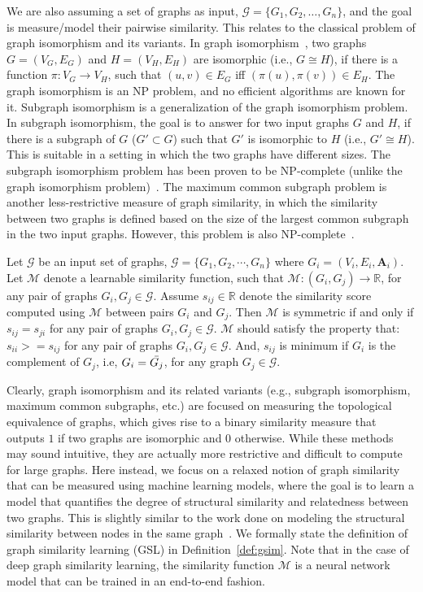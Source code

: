 We are also assuming a set of graphs as input, $\mathcal{G} = \{G_1, G_2, \dots, G_n\}$, and the goal is measure/model their pairwise similarity. This relates to the classical problem of graph isomorphism and its variants. In graph isomorphism~, two graphs $G = (V_G,E_G)$ and $H = (V_H,E_H)$ are isomorphic (i.e., $G \cong H$), if there is a  function $\pi: V_G \rightarrow V_H$, such that $(u,v) \in E_G$ iff $(\pi(u),\pi(v)) \in E_H$. The graph isomorphism is an NP problem, and no efficient algorithms are known for it. Subgraph isomorphism is a generalization of the graph isomorphism problem. In subgraph isomorphism, the goal is to answer for two input graphs $G$ and $H$, if there is a subgraph of $G$ ($G' \subset G$) such that $G'$ is isomorphic to $H$ (i.e., $G' \cong H$). This is suitable in a setting in which the two graphs have different sizes. The subgraph isomorphism problem has been proven to be NP-complete (unlike the graph isomorphism problem)~. The maximum common subgraph problem is another less-restrictive measure of graph similarity, in which the similarity between two graphs is defined based on the size of the largest common subgraph in the two input graphs. However, this problem is also NP-complete~.
\begin{mydef}\label{def:gsim}
Let $\mathcal{G}$ be an input set of graphs, $\mathcal{G} = \{G_1,G_2,\cdots ,G_n\}$ where $G_i=(V_i, E_i, \mathbf{A}_i)$. Let $\mathcal{M}$ denote a learnable similarity function, such that $\mathcal{M}: (G_i, G_j) \rightarrow \mathbb{R}$, for any pair of graphs $G_i, G_j \in \mathcal{G}$. Assume $s_{ij} \in \mathbb{R}$ denote the similarity score computed using $\mathcal{M}$ between pairs $G_i$ and $G_j$. Then $\mathcal{M}$ is symmetric if and only if $s_{ij} = s_{ji}$ for any pair of graphs $G_i, G_j \in \mathcal{G}$. $\mathcal{M}$ should satisfy the property that: $s_{ii} >= s_{ij}$ for any pair of graphs $G_i, G_j \in \mathcal{G}$. And, $s_{ij}$ is minimum if $G_i$ is the complement of $G_j$, i.e, $G_i = \Bar{G_j}$, for any graph $G_j \in \mathcal{G}$.
\end{mydef}
Clearly, graph isomorphism and its related variants (e.g., subgraph isomorphism, maximum common subgraphs, etc.) are focused on measuring the topological equivalence of graphs, which gives rise to a binary similarity measure that outputs $1$ if two graphs are isomorphic and $0$ otherwise. While these methods may sound intuitive, they are actually more restrictive and difficult to compute for large graphs. Here instead, we focus on a relaxed notion of graph similarity that can be measured using machine learning models, where the goal is to learn a model that quantifies the degree of structural similarity and relatedness between two graphs. This is slightly similar to the work done on modeling the structural similarity between nodes in the same graph~. We formally state the definition of graph similarity learning (GSL) in Definition~\ref{def:gsim}. Note that in the case of deep graph similarity learning, the similarity function $\mathcal{M}$ is a neural network model that can be trained in an end-to-end fashion.

